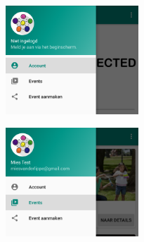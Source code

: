 \documentclass[dutch]{report}
\begin{document}
	\begin{minipage}{0.50\textwidth}
		\begin{center}
			\includegraphics[width=5cm]{images/nietingelogd.png}		
		\end{center}
	\end{minipage}
	\hfill
	\begin{minipage}{0.50\textwidth}
		\begin{center}
			\includegraphics[width=5cm]{images/ingelogd.png}
		\end{center}
	\end{minipage}
	
	
\end{document}
